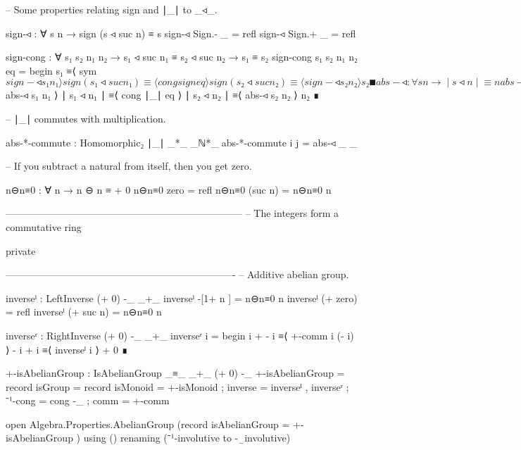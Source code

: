\documentclass[11pt,a4paper]{article}
\begin{document}
\begin{code}
-- Some properties relating sign and ∣_∣ to _◃_.

sign-◃ : ∀ s n → sign (s ◃ suc n) ≡ s
sign-◃ Sign.- _ = refl
sign-◃ Sign.+ _ = refl

sign-cong : ∀ {s₁ s₂ n₁ n₂} →
            s₁ ◃ suc n₁ ≡ s₂ ◃ suc n₂ → s₁ ≡ s₂
sign-cong {s₁} {s₂} {n₁} {n₂} eq = begin
  s₁                  ≡⟨ sym $ sign-◃ s₁ n₁ ⟩
  sign (s₁ ◃ suc n₁)  ≡⟨ cong sign eq ⟩
  sign (s₂ ◃ suc n₂)  ≡⟨ sign-◃ s₂ n₂ ⟩
  s₂                  ∎

abs-◃ : ∀ s n → ∣ s ◃ n ∣ ≡ n
abs-◃ _      zero    = refl
abs-◃ Sign.- (suc n) = refl
abs-◃ Sign.+ (suc n) = refl

abs : {n : ℕ} -> ∣ -[1+ n ] ∣ ≡ suc n
abs {zero} = refl
abs {suc n} = refl

abs-cong : ∀ {s₁ s₂ n₁ n₂} →
           s₁ ◃ n₁ ≡ s₂ ◃ n₂ → n₁ ≡ n₂
abs-cong {s₁} {s₂} {n₁} {n₂} eq = begin
  n₁           ≡⟨ sym $ abs-◃ s₁ n₁ ⟩
  ∣ s₁ ◃ n₁ ∣  ≡⟨ cong ∣_∣ eq ⟩
  ∣ s₂ ◃ n₂ ∣  ≡⟨ abs-◃ s₂ n₂ ⟩
  n₂           ∎

-- ∣_∣ commutes with multiplication.

abs-*-commute : Homomorphic₂ ∣_∣ _*_ _ℕ*_
abs-*-commute i j = abs-◃ _ _

-- If you subtract a natural from itself, then you get zero.

n⊖n≡0 : ∀ n → n ⊖ n ≡ + 0
n⊖n≡0 zero    = refl
n⊖n≡0 (suc n) = n⊖n≡0 n

------------------------------------------------------------------------
-- The integers form a commutative ring

private

  ----------------------------------------------------------------------
  -- Additive abelian group.

  inverseˡ : LeftInverse (+ 0) -_ _+_
  inverseˡ -[1+ n ]  = n⊖n≡0 n
  inverseˡ (+ zero)  = refl
  inverseˡ (+ suc n) = n⊖n≡0 n

  inverseʳ : RightInverse (+ 0) -_ _+_
  inverseʳ i = begin
    i + - i  ≡⟨ +-comm i (- i) ⟩
    - i + i  ≡⟨ inverseˡ i ⟩
    + 0      ∎

  +-isAbelianGroup : IsAbelianGroup _≡_ _+_ (+ 0) -_
  +-isAbelianGroup = record
    { isGroup = record
      { isMonoid = +-isMonoid
      ; inverse  = inverseˡ , inverseʳ
      ; ⁻¹-cong  = cong -_
      }
    ; comm = +-comm
    }

  open Algebra.Properties.AbelianGroup
         (record { isAbelianGroup = +-isAbelianGroup })
    using () renaming (⁻¹-involutive to -‿involutive)


\end{code}
\end{document}
